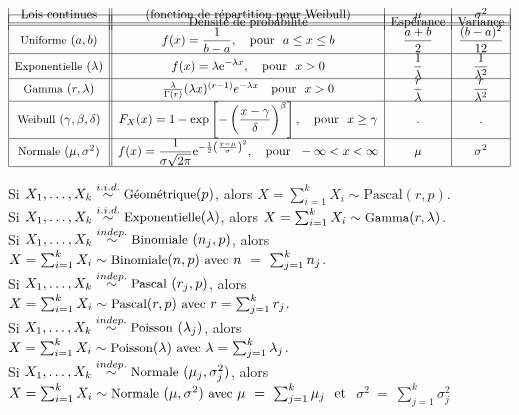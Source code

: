 \documentclass[12pt,french]{article}
\begin{document}
\begin{displaymath}
{\begin{array}{|c||c|c|c|}
\hline
& \mbox{Densité de probabilité}  & \mbox{Espérance} & \mbox{Variance} \\[-18pt]
\mbox{Lois continues} & \mbox{(fonction de répartition pour Weibull)} & \mu  & \sigma^2 \\
\hline \hline \mbox{\small Uniforme}~(a,b)& \displaystyle f(x) =
\frac{1}{b - a},~~~\mbox{pour}~~a \le x \le b &
\displaystyle \frac{a + b}{2}& \displaystyle \frac{(b - a)^2}{12}\\[.10cm]
\hline
\mbox{\small Exponentielle}~(\lambda)&\displaystyle
f(x) = \lambda \mbox{e}^{-\lambda x},~~~\mbox{pour}~~x > 0 & \displaystyle
\frac{1}{\lambda}& \displaystyle \frac{1}{\lambda^{2}}\\[.10cm]
\hline \mbox{\small Gamma}~(r,\lambda)& \frac{\lambda}{\Gamma(r)}(\lambda x)^{(r-1)}e^{-\lambda x} ~~~\mbox{pour}~~x > 0&
\displaystyle
\frac{r}{\lambda}& \displaystyle \frac{r}{\lambda^{2}}\\[.10cm]
\hline \mbox{\small Weibull}~(\gamma, \beta, \delta)&\displaystyle
F_X(x) = 1-\exp\left[- \left (\frac{x-\gamma}{\delta} \right
)^{\beta} \right],~~~\mbox{pour}~~x \geq \gamma & \displaystyle
. & \displaystyle . \\[.10cm]
\hline
\mbox{\small
Normale}~(\mu,\sigma^2)&\displaystyle f(x) = \frac{1}{\sigma
\sqrt{2\pi} } \mbox{e}^{-\frac12
\left(\frac{x-\mu}{\sigma}\right)^2},~~~\mbox{pour}~~-\infty < x <
\infty & \displaystyle
\mu & \displaystyle \sigma^2 \\[.10cm]
\hline
\end{array}}
\end{displaymath}


{\small
Si $X_1, \ldots, X_k \overset{i.i.d.}{\sim} \mbox{\small Géométrique}(p)$, alors $X = \sum_{i=1}^k X_i \sim \mbox{Pascal}(r,p)$.\\[4pt]
Si $X_1, \ldots, X_k \overset{i.i.d.}{\sim} \mbox{\small Exponentielle}(\lambda)$, alors $X = \sum_{i=1}^k X_i \sim \mbox{\small Gamma}(r,\lambda)$.\\[4pt]
Si $X_1, \ldots, X_k \overset{indep.}{\sim} \mbox{\small Binomiale}~ (n_j, p) $, alors $X = \sum_{i=1}^k X_i \sim \mbox{\small Binomiale}(n,p)~ \mbox{\small avec}~n~=~\sum_{j=1}^k n_j$.\\[4pt]
Si $X_1, \ldots, X_k \overset{indep.}{\sim} \mbox{\small Pascal}~ (r_j, p) $, alors $X = \sum_{i=1}^k X_i \sim \mbox{\small Pascal}(r,p)~ \mbox{\small avec}~r = \sum_{j=1}^k r_j$.\\[4pt]
Si $X_1, \ldots, X_k \overset{indep.}{\sim} \mbox{\small Poisson}~ (\lambda_j) $, alors $X = \sum_{i=1}^k X_i \sim \mbox{\small Poisson}(\lambda)~ \mbox{\small avec}~\lambda = \sum_{j=1}^k \lambda_j $.\\[4pt]
Si $X_1, \ldots, X_k \overset{indep.}{\sim} \mbox{\small Normale}~(\mu_j, \sigma^2_j)$, alors $X = \sum_{i=1}^k X_i \sim \mbox{\small Normale}~(\mu, \sigma^2)~ \mbox{\small avec}~ \mu~=~\sum_{j=1}^k \mu_j~~
\mbox{et }$ $\sigma^2~=~\sum_{j=1}^k \sigma^2_j$
}
\end{document}
